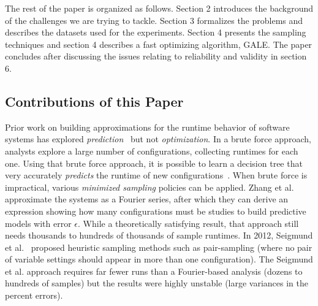 \documentclass{sig-alternative}
\begin{document}
The rest of the paper is organized as follows. Section 2 introduces the background of the challenges we are trying to tackle. Section 3 formalizes the problems and describes the datasets used for the experiments. Section 4 presents the sampling techniques and section 4 describes a fast optimizing algorithm, GALE. The paper concludes after discussing the issues relating to reliability and validity in section 6. 
 
 
 
 \subsection{Contributions of this Paper}
 Prior work on building  approximations for the runtime behavior of software systems has explored {\em prediction}~\cite{guo2013variability,siegmund2012predicting,westermann2012automated,sarkar2015cos,zhang2015performance}
 but not {\em optimization}. In a  brute force approach, analysts  explore a large number
 of configurations, collecting runtimes for each one.
 Using that brute force approach,  it is possible to learn a decision tree that very accurately {\em predicts} the runtime of new configurations~\cite{guo2013variability}. 
 When  brute force is impractical,  
 various {\em minimized sampling} policies can be applied.  Zhang et al.~\cite{zhang2015performance} approximate the
 systems as a Fourier series, after which they can derive an expression showing how many configurations must be studies
 to build predictive models with error $\epsilon$. While a theoretically satisfying result, that approach still needs thousands to hundreds of thousands of sample runtimes. In 2012,  Seigmund et al.~\cite{siegmund2012predicting} proposed heuristic
 sampling methods such as pair-sampling (where no pair of 
 variable settings should appear in more than one configuration). The  Seigmund et al. approach  requires far fewer runs than a Fourier-based analysis (dozens to hundreds of samples) but the results were highly unstable (large variances
 in the percent errors).
\end{document}
